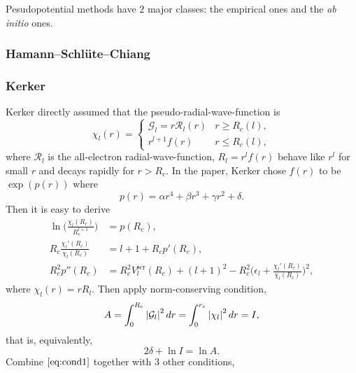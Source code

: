 
Pesudopotential methods have $2$ major classes: the empirical ones
and the \textit{ab initio} ones.

\subsubsection{Hamann--Schlüte--Chiang}

\subsubsection{Kerker}

Kerker directly assumed that the pseudo-radial-wave-function is
\begin{equation}
	\chi_l (r) =
	\begin{cases}
		\mathcal{G}_l = r \mathcal{R}_l (r) & r \geq R_c (l), \\
		r^{l+1} f(r)                        & r \leq R_c (l),
	\end{cases}
\end{equation}
where $\mathcal{R}_l$ is the all-electron radial-wave-function,
$R_l = r^l f(r)$ behave like $r^l$ for small $r$ and decays rapidly for $r > R_c$.
In the paper, Kerker chose $f(r)$ to be $\exp( p(r) )$ where
\begin{equation}
	p(r) =  \alpha r^4 + \beta r^3 + \gamma r^2 + \delta.
\end{equation}
Then it is easy to derive
\begin{align}
	\ln \bigg( \frac{ \chi_l(R_c) }{ R_c^{l+1} } \bigg)
	 & = p(R_c), \label{eq:kerker0}                            \\
	R_c \frac{ \chi_l'(R_c) }{ \chi_l(R_c) }
	 & = l + 1 + R_c p'(R_c), \label{eq:kerker1}               \\
	R_c^2 p''(R_c)
	 & = R_c^2 V_l^\text{scr} (R_c) + (l + 1)^2 - R_c^2 \bigg(
	\epsilon_l + \frac{ \chi_l'(R_c) }{ \chi_l(R_c) }
	\bigg)^2, \label{eq:kerker-pp}
\end{align}
where $\chi_l (r) = r R_l$. Then apply norm-conserving condition,
\begin{equation}
	A = \int_{0}^{R_c} \abs{\mathcal{G}_l}^2 \, dr = \int_{0}^{r_c} \abs{\chi_l}^2 \, dr = I,
\end{equation}
that is, equivalently,
\begin{equation}\label{eq:cond1}
	2\delta + \ln I = \ln A.
\end{equation}
Combine $\eqref{eq:cond1}$ together with $3$ other conditions,
